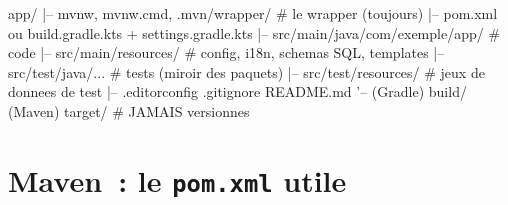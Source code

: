 \begin{codeplain}
app/
|-- mvnw, mvnw.cmd, .mvn/wrapper/          # le wrapper (toujours)
|-- pom.xml            ou   build.gradle.kts + settings.gradle.kts
|-- src/main/java/com/exemple/app/         # code
|-- src/main/resources/                    # config, i18n, schemas SQL, templates
|-- src/test/java/...                       # tests (miroir des paquets)
|-- src/test/resources/                      # jeux de donnees de test
|-- .editorconfig  .gitignore  README.md
'-- (Gradle) build/    (Maven) target/       # JAMAIS versionnes
\end{codeplain}

\section{Maven~: le \texttt{pom.xml} utile}

